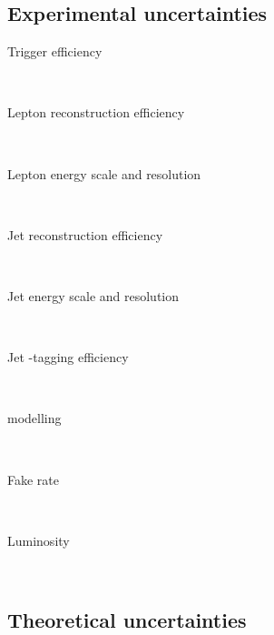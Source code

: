 

\subsection{Experimental uncertainties}
\label{sec:syst:exp}

\begin{description}
\item[Trigger efficiency] \hfill \\	
	
\item[Lepton reconstruction efficiency] \hfill \\
	
\item[Lepton energy scale and resolution] \hfill \\

\item[Jet reconstruction efficiency] \hfill \\

\item[Jet energy scale and resolution] \hfill \\

\item[Jet \Pbottom-tagging efficiency] \hfill \\

\item[\met modelling] \hfill \\

\item[Fake rate] \hfill \\

\item[Luminosity] \hfill \\

\end{description}



\subsection{Theoretical uncertainties}
\label{sec:syst:theor}

